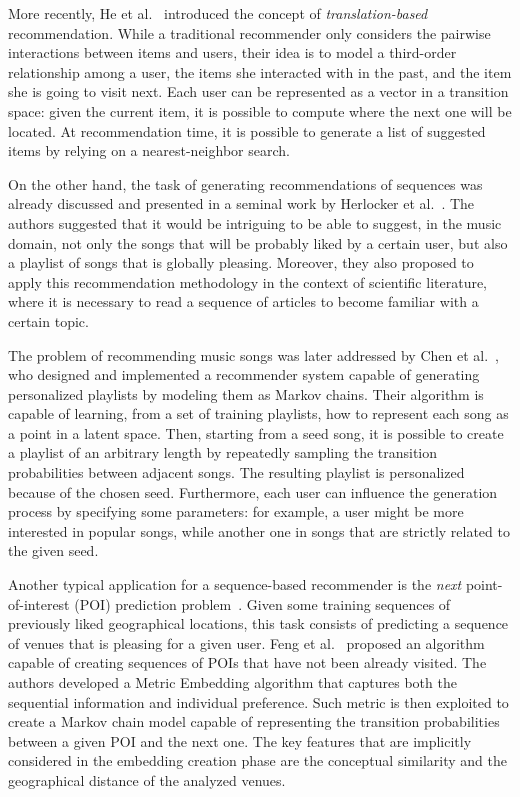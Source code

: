 More recently, He et al.~\cite{He2017} introduced the concept of \emph{translation-based} recommendation. While a traditional recommender only considers the pairwise interactions between items and users, their idea is to model a third-order relationship among a user, the items she interacted with in the past, and the item she is going to visit next. Each user can be represented as a vector in a transition space: given the current item, it is possible to compute where the next one will be located. At recommendation time, it is possible to generate a list of suggested items by relying on a nearest-neighbor search.

On the other hand, the task of generating recommendations of sequences was already discussed and presented in a seminal work by Herlocker et al.~\cite{Herlocker2004}. The authors suggested that it would be intriguing to be able to suggest, in the music domain, not only the songs that will be probably liked by a certain user, but also a playlist of songs that is globally pleasing. Moreover, they also proposed to apply this recommendation methodology in the context of scientific literature, where it is necessary to read a sequence of articles to become familiar with a certain topic.

The problem of recommending music songs was later addressed by Chen et al.~\cite{Chen2012}, who designed and implemented a recommender system capable of generating personalized playlists by modeling them as Markov chains. Their algorithm is capable of learning, from a set of training playlists, how to represent each song as a point in a latent space. Then, starting from a seed song, it is possible to create a playlist of an arbitrary length by repeatedly sampling the transition probabilities between adjacent songs. The resulting playlist is personalized because of the chosen seed. Furthermore, each user can influence the generation process by specifying some parameters: for example, a user might be more interested in popular songs, while another one in songs that are strictly related to the given seed.

Another typical application for a sequence-based recommender is the \emph{next} point-of-interest (POI) prediction problem~\cite{Quadrana2018}. Given some training sequences of previously liked geographical locations, this task consists of predicting a sequence of venues that is pleasing for a given user. Feng et al.~\cite{Feng2015} proposed an algorithm capable of creating sequences of POIs that have not been already visited. The authors developed a Metric Embedding algorithm that captures both the sequential information and individual preference. Such metric is then exploited to create a Markov chain model capable of representing the transition probabilities between a given POI and the next one. The key features that are implicitly considered in the embedding creation phase are the conceptual similarity and the geographical distance of the analyzed venues.

